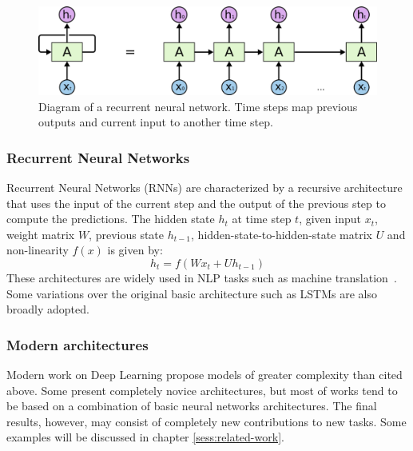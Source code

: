 \documentclass[English]{style/ic-tese-v3}
\begin{document}
\begin{figure}
\begin{center}
    \includegraphics[width=0.9\linewidth]{./img/rnn2.png}
\caption{
    Diagram of a recurrent neural network.
    Time steps map previous outputs and current input to another time step.
}
\label{fig:rnn}
\end{center}
\end{figure}

\subsubsection{Recurrent Neural Networks}
Recurrent Neural Networks (RNNs) are characterized by a recursive architecture
that uses the input of the current step and the output of the previous
step to compute the predictions.
The hidden state $h_t$ at time step $t$, given input $x_t$, weight matrix $W$,
previous state $h_{t-1}$, hidden-state-to-hidden-state matrix $U$ and
non-linearity $f(x)$ is given by:
$$h_t = f\left(Wx_t + Uh_{t-1}\right)$$
These architectures are widely used in NLP tasks such as
machine translation~\cite{ref:rnn-nlp}.
Some variations over the original basic architecture such as
LSTMs are also broadly adopted.

\subsubsection{Modern architectures}
Modern work on Deep Learning propose models of greater complexity than cited above.
Some present completely novice architectures, but most of works tend to be
based on a combination of basic neural networks architectures. The final results, however, may consist
of completely new contributions to new tasks.
Some examples will be discussed in chapter \ref{sess:related-work}.
\end{document}
